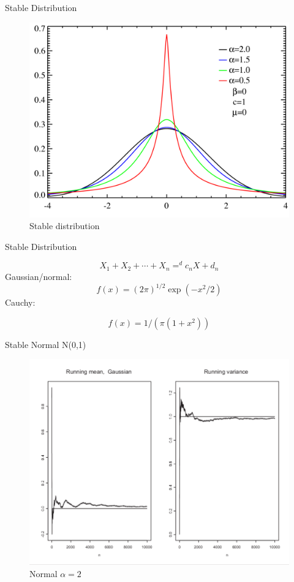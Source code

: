 \documentclass[ignorenonframetext,]{beamer}
\begin{document}
\begin{frame}{Stable Distribution}

\begin{figure}
\centering
\includegraphics{pics/04.png}
\caption{Stable distribution}
\end{figure}

\end{frame}

\begin{frame}{Stable Distribution}

\[ X_1 + X_2 + \cdots + X_n =^d c_n X + d_n \] Gaussian/normal:
\[ f(x) = (2\pi)^{1/2} \exp (-x^2/2)\] Cauchy:

\[ f(x) = 1/(\pi(1+x^2)) \]

\end{frame}

\begin{frame}{Stable Normal N(0,1)}

\begin{figure}
\centering
\includegraphics{pics/05.png}
\caption{Normal \(\alpha = 2\)}
\end{figure}

\end{frame}
\end{document}
